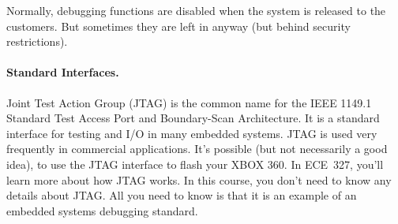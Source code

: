Normally, debugging functions are disabled when the system is released to the customers. But sometimes they are left in anyway (but behind security restrictions). 

\paragraph{Standard Interfaces.}
Joint Test Action Group (JTAG) is the common name for the IEEE 1149.1 Standard Test Access Port and Boundary-Scan Architecture. It is a standard interface for testing and I/O in many embedded systems. JTAG is used very frequently in commercial applications. It's possible (but not necessarily a good idea), to use the JTAG interface to flash your XBOX 360. In ECE~327, you'll learn more about how JTAG works. In this course, you don't need to know any details about JTAG. All you need to know is that it is an example of an embedded systems debugging standard.







